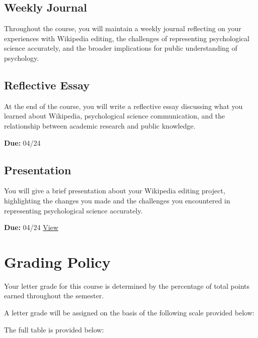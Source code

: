 \documentclass[
]{book}
\begin{document}
\subsection*{Weekly Journal}\label{weekly-journal}


Throughout the course, you will maintain a weekly journal reflecting on your experiences with Wikipedia editing, the challenges of representing psychological science accurately, and the broader implications for public understanding of psychology.

\subsection*{Reflective Essay}\label{reflective-essay}


At the end of the course, you will write a reflective essay discussing what you learned about Wikipedia, psychological science communication, and the relationship between academic research and public knowledge.

\textbf{Due:} 04/24

\subsection*{Presentation}\label{presentation}


You will give a brief presentation about your Wikipedia editing project, highlighting the changes you made and the challenges you encountered in representing psychological science accurately.

\textbf{Due:} 04/24 \href{https://dashboard.wikiedu.org/training/students/in-class-presentation-exercise}{View}

\section*{Grading Policy}\label{grading-policy-4}


Your letter grade for this course is determined by the percentage of total points earned throughout the semester.

A letter grade will be assigned on the basis of the following scale provided below:

The full table is provided below:
\end{document}
